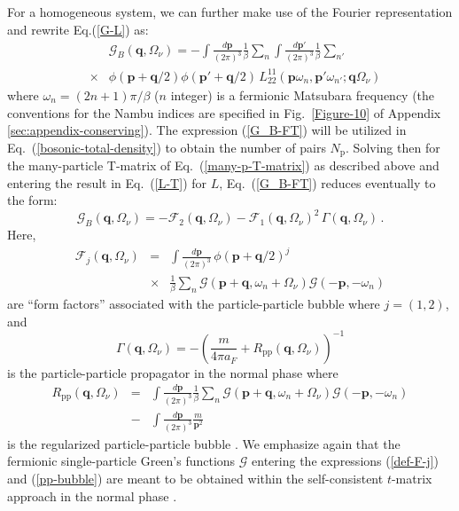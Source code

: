 \documentclass[pra,twocolumn,aps,amssymb,showpacs,superscriptaddress]{revtex4-1}
\begin{document}
For a homogeneous system, we can further make use of the Fourier representation and rewrite Eq.(\ref{G-L}) as:
\begin{eqnarray}
& & \mathcal{G}_{B}(\mathbf{q},\Omega_{\nu}) = -  \int \! \frac{d{\mathbf p}}{(2\pi)^{3}} \frac{1}{\beta} \sum_{n}  \int \! \frac{d{\mathbf p}'}{(2\pi)^{3}}  \frac{1}{\beta} \sum_{n'} 
\nonumber \\
& \times & \phi({\mathbf p}+{\mathbf q}/2) \phi({\mathbf p}'+{\mathbf q}/2) \, L^{11}_{22} ({\mathbf p}\omega_{n},{\mathbf p}'\omega_{n'};\mathbf{q}\Omega_{\nu})
\label{G_B-FT}  
\end{eqnarray}
where $\omega_{n} = (2n+1)\pi/\beta$ ($n$ integer) is a fermionic Matsubara frequency (the conventions for the Nambu indices are specified in Fig.~\ref{Figure-10} of
Appendix \ref{sec:appendix-conserving}).
The expression (\ref{G_B-FT}) will be utilized in Eq.~(\ref{bosonic-total-density}) to obtain the number of pairs $N_{\mathrm{p}}$.
Solving then for the many-particle T-matrix of Eq.~(\ref{many-p-T-matrix}) as described above and entering the result in Eq.~(\ref{L-T}) for $L$, Eq.~(\ref{G_B-FT}) reduces eventually to the form:
\begin{equation}
\mathcal{G}_{B}(\mathbf{q},\Omega_{\nu})  =  - \mathcal{F}_{2}(\mathbf{q},\Omega_{\nu}) - \mathcal{F}_{1}(\mathbf{q},\Omega_{\nu})^{2} \, \Gamma(\mathbf{q},\Omega_{\nu}) \, .
\label{G_B-FT-sc}
\end{equation}
Here, 
\begin{eqnarray}
\mathcal{F}_{j}(\mathbf{q},\Omega_{\nu}) & = & \int \! \frac{d{\mathbf p}}{(2\pi)^{3}} \, \phi({\mathbf p}+{\mathbf q}/2)^{j}   
\label{def-F-j} \\
& \times & \frac{1}{\beta} \sum_{n} \mathcal{G}(\mathbf{p}+\mathbf{q},\omega_{n}+\Omega_{\nu}) \mathcal{G}(-\mathbf{p},-\omega_{n})     
\nonumber
\end{eqnarray}
are ``form factors'' associated with the particle-particle bubble where $j=(1,2)$, and
\begin{equation}
\Gamma(\mathbf{q},\Omega_{\nu}) = - \left( \frac{m}{4 \pi a_{F}} + R_{\mathrm{pp}}(\mathbf{q},\Omega_{\nu}) \right)^{-1}
\label{Gamma}
\end{equation}
is the particle-particle propagator in the normal phase where
\begin{eqnarray}
R_{\mathrm{pp}}(\mathbf{q},\Omega_{\nu}) & = & \int \! \frac{d{\mathbf p}}{(2\pi)^{3}} \frac{1}{\beta} \sum_{n}  \mathcal{G}(\mathbf{p}+\mathbf{q},\omega_{n}+\Omega_{\nu}) \mathcal{G}(-\mathbf{p},-\omega_{n}) 
\nonumber \\
& - & \int \! \frac{d{\mathbf p}}{(2\pi)^{3}} \frac{m}{\mathbf{p}^{2}} 
\label{pp-bubble} 
\end{eqnarray}
is the regularized particle-particle bubble \cite{Physics-Reports-2018}.
We emphasize again that the fermionic single-particle Green's functions $\mathcal{G}$ entering the expressions (\ref{def-F-j}) and (\ref{pp-bubble}) are meant to be obtained within the self-consistent $t$-matrix 
approach in the normal phase \cite{PPS-2019}.
\end{document}

